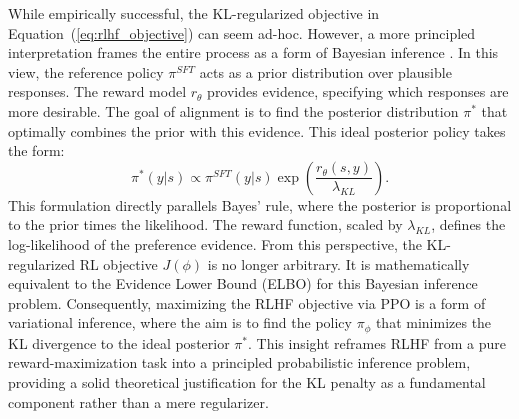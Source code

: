 While empirically successful, the KL-regularized objective in Equation~(\ref{eq:rlhf_objective}) can seem ad-hoc. However, a more principled interpretation frames the entire process as a form of Bayesian inference \citep{korbak2022rl}. In this view, the reference policy $\pi^{SFT}$ acts as a prior distribution over plausible responses. The reward model $r_\theta$ provides evidence, specifying which responses are more desirable. The goal of alignment is to find the posterior distribution $\pi^*$ that optimally combines the prior with this evidence. This ideal posterior policy takes the form:
\begin{equation}
    \pi^*(y|s) \propto \pi^{SFT}(y|s) \exp\left(\frac{r_\theta(s, y)}{\lambda_{KL}}\right).
\label{eq:rlhf_posterior}
\end{equation}
This formulation directly parallels Bayes' rule, where the posterior is proportional to the prior times the likelihood. The reward function, scaled by $\lambda_{KL}$, defines the log-likelihood of the preference evidence. From this perspective, the KL-regularized RL objective $J(\phi)$ is no longer arbitrary. It is mathematically equivalent to the Evidence Lower Bound (ELBO) for this Bayesian inference problem. Consequently, maximizing the RLHF objective via PPO is a form of variational inference, where the aim is to find the policy $\pi_\phi$ that minimizes the KL divergence to the ideal posterior $\pi^*$. This insight reframes RLHF from a pure reward-maximization task into a principled probabilistic inference problem, providing a solid theoretical justification for the KL penalty as a fundamental component rather than a mere regularizer.

